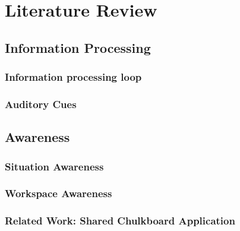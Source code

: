 
\chapter{Literature Review}
\section{Information Processing}
\subsection{Information processing loop}
\subsection{Auditory Cues}

\section{Awareness} %
\subsection{Situation Awareness}
\subsection{Workspace Awareness}
\subsection{Related Work: Shared Chulkboard Application}
